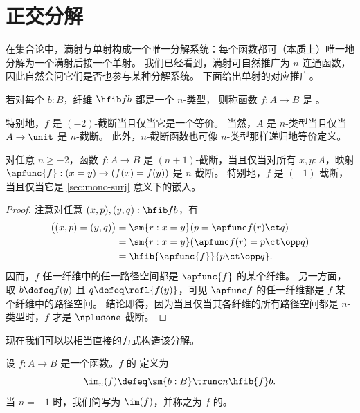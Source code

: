 \section{正交分解}
\label{sec:image-factorization}

%
%
在集合论中，满射与单射构成一个唯一分解系统：每个函数都可（本质上）唯一地分解为一个满射后接一个单射。
我们已经看到，满射可自然推广为 $n$-连通函数，因此自然会问它们是否也参与某种分解系统。
下面给出单射的对应推广。

\begin{defn}
  若对每个 $b:B$，纤维 $\hfib f b$ 都是一个 $n$-类型，
  则称函数 $f:A\to B$ 是
。
\end{defn}

特别地，$f$ 是 $(-2)$-截断当且仅当它是一个等价。
当然，$A$ 是 $n$-类型当且仅当 $A\to\unit$ 是 $n$-截断。
此外，$n$-截断函数也可像 $n$-类型那样递归地等价定义。

\begin{lem}\label{thm:modal-mono}
  对任意 $n\ge -2$，函数 $f:A\to B$ 是 $(n+1)$-截断，当且仅当对所有 $x,y:A$，映射 $\apfunc{f}:(x=y) \to (f(x)=f(y))$ 是 $n$-截断。
  特别地，$f$ 是 $(-1)$-截断，当且仅当它是 \cref{sec:mono-surj} 意义下的嵌入。
\end{lem}
\begin{proof}
  注意对任意 $(x,p),(y,q):\hfib f b$，有
  \begin{align*}
    \big((x,p) = (y,q)\big)
    &= \sm{r:x=y} (p = \apfunc f(r)\ct q)\\
    &= \sm{r:x=y} (\apfunc f (r) = p\ct \opp q)\\
    &= \hfib{\apfunc{f}}{p\ct \opp q}.
  \end{align*}
  因而，$f$ 任一纤维中的任一路径空间都是 $\apfunc{f}$ 的某个纤维。
  另一方面，取 $b\defeq f(y)$ 且 $q\defeq \refl{f(y)}$，可见 $\apfunc f$ 的任一纤维都是 $f$ 某个纤维中的路径空间。
  结论即得，因为当且仅当其各纤维的所有路径空间都是 $n$-类型时，$f$ 才是 $\nplusone$-截断。
\end{proof}

现在我们可以以相当直接的方式构造该分解。

\begin{defn}\label{defn:modal-image}
设 $f:A\to B$ 是一个函数。$f$ 的
%
%
%
%
定义为
\begin{equation*}
\im_n(f)\defeq \sm{b:B} \trunc n{\hfib{f}b}.
\end{equation*}
当 $n=-1$ 时，我们简写为 $\im(f)$，并称之为 $f$ 的。
\end{defn}

